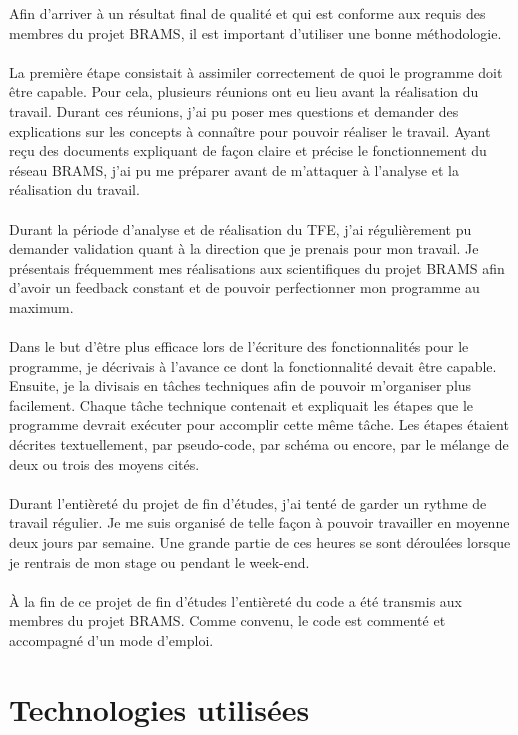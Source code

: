 \documentclass[11pt]{article}
\begin{document}
Afin d'arriver à un résultat final de qualité et qui est conforme aux requis des membres du projet BRAMS, il est important d'utiliser une bonne méthodologie.\\
\\
La première étape consistait à assimiler correctement de quoi le programme doit être capable.
Pour cela, plusieurs réunions ont eu lieu avant la réalisation du travail.
Durant ces réunions, j'ai pu poser mes questions et demander des explications sur les concepts à connaître pour pouvoir réaliser le travail.
Ayant reçu des documents expliquant de façon claire et précise le fonctionnement du réseau BRAMS, j'ai pu me préparer avant de m'attaquer à l'analyse et la réalisation du travail.\\
\\
Durant la période d'analyse et de réalisation du TFE, j'ai régulièrement pu demander validation quant à la direction que je prenais pour mon travail.
Je présentais fréquemment mes réalisations aux scientifiques du projet BRAMS afin d'avoir un feedback constant et de pouvoir perfectionner mon programme au maximum.\\
\\
Dans le but d'être plus efficace lors de l'écriture des fonctionnalités pour le programme, je décrivais à l'avance ce dont la fonctionnalité devait être capable.
Ensuite, je la divisais en tâches techniques afin de pouvoir m'organiser plus facilement.
Chaque tâche technique contenait et expliquait les étapes que le programme devrait exécuter pour accomplir cette même tâche.
Les étapes étaient décrites textuellement, par pseudo-code, par schéma ou encore, par le mélange de deux ou trois des moyens cités.\\
\\
Durant l'entièreté du projet de fin d'études, j'ai tenté de garder un rythme de travail régulier.
Je me suis organisé de telle façon à pouvoir travailler en moyenne deux jours par semaine.
Une grande partie de ces heures se sont déroulées lorsque je rentrais de mon stage ou pendant le week-end.\\
\\
À la fin de ce projet de fin d'études l'entièreté du code a été transmis aux membres du projet BRAMS.
Comme convenu, le code est commenté et accompagné d'un mode d'emploi.

\newpage

\section{Technologies utilisées}
\end{document}
